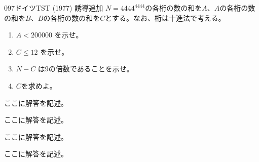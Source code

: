 \begin{thm}{097}{}{ドイツTST (1977) 誘導追加}
 $N=4444^{4444}$の各桁の数の和を$A$、$A$の各桁の数の和を$B$、$B$の各桁の数の和を$C$とする。なお、桁は十進法で考える。
 \begin{enumerate}
  \item $A<200000$ を示せ。
  \item $C\le 12$ を示せ。
  \item $N-C$ は9の倍数であることを示せ。
  \item $C$を求めよ。
 \end{enumerate}
\end{thm}

ここに解答を記述。

ここに解答を記述。

ここに解答を記述。

ここに解答を記述。